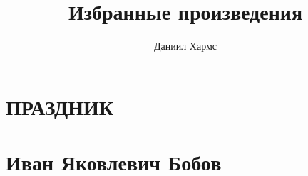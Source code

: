 \documentclass{book}
\title{Избранные произведения}
\author{Даниил Хармс}
\date{}
\begin{document}
\maketitle

\chapter{ПРАЗДНИК}


\chapter{Иван Яковлевич Бобов}

\end{document}
